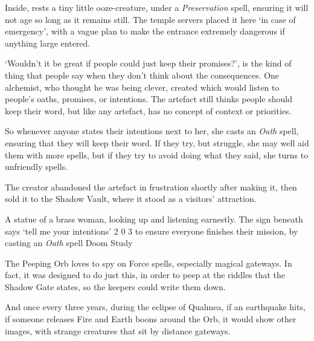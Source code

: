 Inside, rests a tiny little ooze-creature, under a \textit{Preservation} spell, ensuring it will not age so long as it remains still.
The temple \glspl{server} placed it here `in case of emergency', with a vague plan to make the entrance extremely dangerous if anything large entered.



\begin{exampletext}
  `Wouldn't it be great if people could just keep their promises?', is the kind of thing that people say when they don't think about the consequences.
  One alchemist, who thought he was being clever, created  which would listen to people's oaths, promises, or intentions.
  The \gls{artefact} still thinks people should keep their word, but like any \gls{artefact}, has no concept of context or priorities.

  So whenever anyone states their intentions next to her, she casts an \textit{Oath} spell, ensuring that they will keep their word.
  If they try, but struggle, she may well aid them with more spells, but if they try to avoid doing what they said, she turns to unfriendly spells.

  The creator abandoned the \gls{artefact} in frustration shortly after making it, then sold it to the Shadow Vault, where it stood as a visitors' attraction.
\end{exampletext}

  {A statue of a brass woman, looking up and listening earnestly.
  The sign beneath says `tell me your intentions'}%
  {2}%
  {0}%
  {3}%
  {to ensure everyone finishes their mission, by casting an \textit{Oath} spell}%
  {Doom Study}%
  {
    \setcounter{Fate}{2}
    \setcounter{Water}{2}
    \setcounter{Empathy}{2}
    \setcounter{Wyldcrafting}{1}
  }%

\showStdSpells[
  \setcounter{diceNo}{0}
]


\begin{exampletext}
  The Peeping Orb loves to spy on Force spells, especially magical gateways.
  In fact, it was designed to do just this, in order to peep at the riddles that the Shadow Gate states, so the keepers could write them down.

  And once every three years, during the eclipse of Qualmea,%
  if an earthquake hits, if someone releases Fire and Earth \glspl{boon} around the Orb, it would show other images, with strange creatures that sit by distance gateways.
\end{exampletext}

